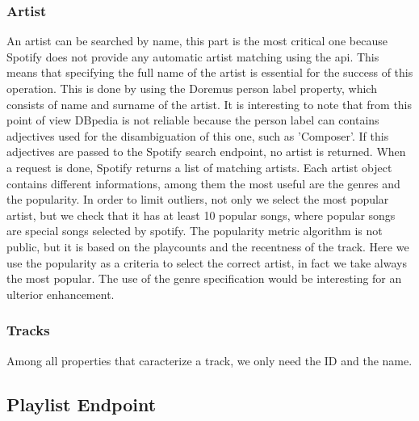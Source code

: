 \documentclass[paper=a4, fontsize=11pt]{scrartcl}
\begin{document}
\subsubsection{Artist}
An artist can be searched by name, this part is the most critical one because Spotify does not provide any automatic artist matching using the api. This means that specifying the full name of the artist is essential for the success of this operation.
This is done by using the Doremus person label property, which consists of name and surname of the artist. It is interesting to note that from this point of view DBpedia is not reliable because the person label can contains adjectives used for the disambiguation of this one, such as 'Composer'. If this adjectives are passed to the Spotify search endpoint, no artist is returned.
When a request is done, Spotify returns a list of matching artists. Each artist object contains different informations, among them the most useful are the genres and the popularity. 
In order to limit outliers, not only we select the most popular artist, but we check that it has at least 10 popular songs, where popular songs are special songs selected by spotify. The popularity metric algorithm is not public, but it is based on the playcounts and the recentness of the track.
Here we use the popularity as a criteria to select the correct artist, in fact we take always the most popular. The use of the genre specification would be interesting for an ulterior enhancement.
\subsubsection{Tracks}
Among all properties that caracterize a track, we only need the ID and the name.

\subsection{Playlist Endpoint}
\end{document}
